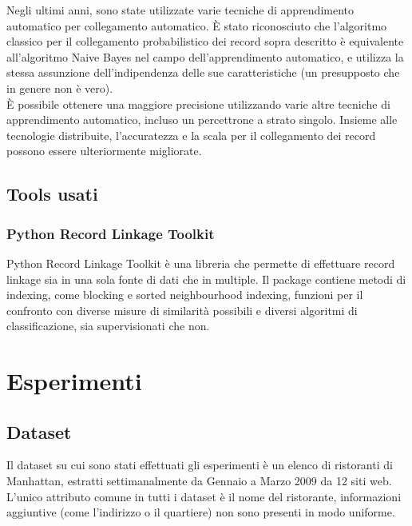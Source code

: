 \documentclass[a4paper,12pt]{article}
\begin{document}
\begin{description}[align=left]
	\item[Machine learning] Negli ultimi anni, sono state utilizzate varie tecniche di apprendimento automatico per collegamento automatico. È stato riconosciuto che l'algoritmo classico per il collegamento probabilistico dei record sopra descritto è equivalente all'algoritmo Naive Bayes nel campo dell'apprendimento automatico, e utilizza la stessa assunzione dell'indipendenza delle sue caratteristiche (un presupposto che in genere non è vero).\\È possibile ottenere una maggiore precisione utilizzando varie altre tecniche di apprendimento automatico, incluso un percettrone a strato singolo. Insieme alle tecnologie distribuite, l'accuratezza e la scala per il collegamento dei record possono essere ulteriormente migliorate.	
\end{description}

\subsection{Tools usati}

\subsubsection{Python Record Linkage Toolkit }
Python Record Linkage Toolkit è una libreria che permette di effettuare record linkage sia in una sola fonte di dati che in multiple. Il package contiene metodi di indexing, come blocking e sorted neighbourhood indexing, funzioni per il confronto con diverse misure di similarità possibili e diversi algoritmi di classificazione, sia supervisionati che non. 


\section{Esperimenti}
\subsection{Dataset}
Il dataset su cui sono stati effettuati gli esperimenti è un elenco di ristoranti di Manhattan, estratti settimanalmente da Gennaio a Marzo 2009 da 12 siti web. L'unico attributo comune in tutti i dataset è il nome del ristorante, informazioni aggiuntive (come l'indirizzo o il quartiere) non sono presenti in modo uniforme.
\end{document}
